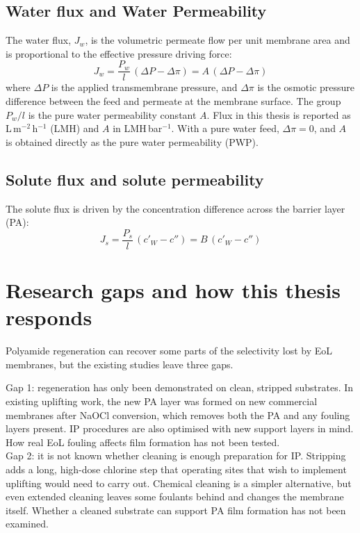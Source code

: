 \subsection{Water flux and Water Permeability}
The water flux, $J_w$, is the volumetric permeate flow per unit membrane area and is proportional to the effective pressure driving force:
\begin{equation}
  J_w = \frac{P_w}{l}\,(\Delta P - \Delta\pi) = A\,(\Delta P - \Delta\pi)
    \label{eq:water-flux}
\end{equation}
where $\Delta P$ is the applied transmembrane pressure, and $\Delta\pi$ is the osmotic pressure difference between the feed and permeate at the membrane surface. The group $P_w/l$ is the pure water permeability constant $A$. Flux in this thesis is reported as L\,m$^{-2}$\,h$^{-1}$ (LMH) and $A$ in LMH\,bar$^{-1}$. With a pure water
feed, $\Delta\pi = 0$, and $A$ is obtained directly as the pure water
permeability (PWP).

\subsection{Solute flux and solute permeability}
The solute flux is driven by the concentration difference across the barrier layer (PA):
\begin{equation}
  J_s = \frac{P_s}{l}\,(c'_W - c'') = B\,(c'_W - c'')
  \label{eq:salt-flux}
\end{equation}


\section{Research gaps and how this thesis responds}
\label{sec:research-gap}

Polyamide regeneration can recover some parts of the selectivity lost by EoL membranes, but the existing studies leave three gaps.

Gap 1: regeneration has only been demonstrated on clean, stripped substrates. In existing uplifting work, the new PA layer was formed on new commercial membranes after NaOCl conversion, which removes both the PA and any fouling layers present. IP procedures are also optimised with new support layers in mind. How real EoL fouling affects film formation has not been tested. \\

Gap 2: it is not known whether cleaning is enough preparation for IP. Stripping adds a long, high-dose chlorine step that operating sites that wish to implement uplifting would need to carry out. Chemical cleaning is a simpler alternative, but even extended cleaning leaves some foulants behind and changes the membrane itself. Whether a cleaned substrate can support PA film formation has not been examined. \\

